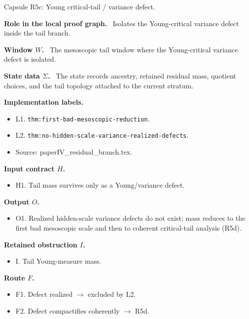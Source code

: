 \documentclass[11pt]{amsart}
\newcommand{\capsulefield}[1]{\par\smallskip\noindent\textbf{#1.}\ }
\begin{document}
\begin{proofcapsule}{Capsule R5c: Young critical-tail / variance defect.}
  \capsulefield{Role in the local proof graph}
  Isolates the Young-critical variance defect inside the tail branch.

  \capsulefield{Window \(W\)}
The mesoscopic tail window where the Young-critical variance defect is isolated.

  \capsulefield{State data \(\Sigma\)}
The state records ancestry, retained residual mass, quotient choices, and the tail topology attached to the current stratum.

  \capsulefield{Implementation labels}
  \begin{itemize}[leftmargin=1.8em]
  \item L1. \texttt{thm:first-bad-mesoscopic-reduction}.
  \item L2. \texttt{thm:no-hidden-scale-variance-realized-defects}.
  \item Source: paperIV\_residual\_branch.tex.
  \end{itemize}

  \capsulefield{Input contract \(H\)}
  \begin{itemize}[leftmargin=1.8em]
  \item H1. Tail mass survives only as a Young/variance defect.
  \end{itemize}

  \capsulefield{Output \(O\)}
  \begin{itemize}[leftmargin=1.8em]
  \item O1. Realized hidden-scale variance defects do not exist; mass reduces to the first bad mesoscopic scale and then to coherent critical-tail analysis (R5d).
  \end{itemize}

  \capsulefield{Retained obstruction \(I\)}
  \begin{itemize}[leftmargin=1.8em]
  \item I. Tail Young-measure mass.
  \end{itemize}

  \capsulefield{Route \(F\)}
  \begin{itemize}[leftmargin=1.8em]
  \item F1. Defect realized $\to$ excluded by L2.
  \item F2. Defect compactifies coherently $\to$ R5d.
  \end{itemize}


\end{proofcapsule}
\end{document}
